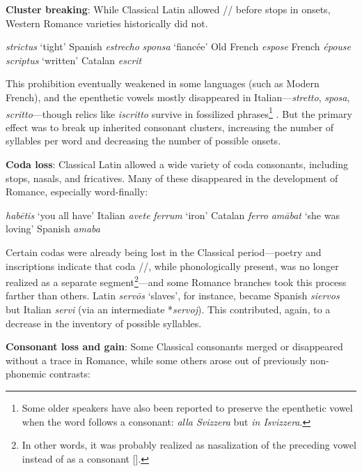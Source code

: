 \documentclass[12pt,twoside]{article}
\newcommand{\ipa}[1]{/\textipa{#1}/}
\newcommand{\ipab}[1]{[\textipa{#1}]}
\newcommand{\yields}{\textrightarrow}
\begin{document}
\textbf{Cluster breaking}: While Classical Latin allowed \ipa{s} before stops in onsets, Western Romance varieties historically did not.

\begin{exe}
\ex \emph{strictus} `tight' \yields{} Spanish \emph{estrecho}
\ex \emph{sponsa} `fiancée' \yields{} Old French \emph{espose} \yields{} French \emph{épouse}
\ex \emph{scriptus} `written' \yields{} Catalan \emph{escrit}
\end{exe}

This prohibition eventually weakened in some languages (such as Modern French), and the epenthetic vowels mostly disappeared in Italian---\emph{stretto}, \emph{sposa}, \emph{scritto}---though relics like \emph{iscritto} survive in fossilized phrases\footnote{Some older speakers have also been reported to preserve the epenthetic vowel when the word follows a consonant: \emph{alla Svizzera} but \emph{in Isvizzera}.} \citep{alkire}. But the primary effect was to break up inherited consonant clusters, increasing the number of syllables per word and decreasing the number of possible onsets.

\textbf{Coda loss}: Classical Latin allowed a wide variety of coda consonants, including stops, nasals, and fricatives. Many of these disappeared in the development of Romance, especially word-finally:

\begin{exe}
\ex \emph{hab\=etis} `you all have' \yields{} Italian \emph{avete}
\ex \emph{ferrum} `iron' \yields{} Catalan \emph{ferro}
\ex \emph{am\=abat} `she was loving' \yields{} Spanish \emph{amaba}
\end{exe}

Certain codas were already being lost in the Classical period---poetry and inscriptions indicate that coda \ipa{m}, while phonologically present, was no longer realized as a separate segment\footnote{In other words, it was probably realized as nasalization of the preceding vowel instead of as a consonant \ipab{m}.}---and some Romance branches took this process farther than others. Latin \emph{serv\=os} `slaves', for instance, became Spanish \emph{siervos} but Italian \emph{servi} (via an intermediate *\emph{servoj}). This contributed, again, to a decrease in the inventory of possible syllables.

\textbf{Consonant loss and gain}: Some Classical consonants merged or disappeared without a trace in Romance, while some others arose out of previously non-phonemic contrasts:
\end{document}
